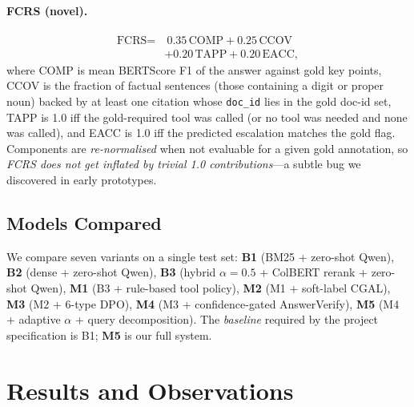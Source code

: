\documentclass[11pt,a4paper,twocolumn]{article}
\begin{document}
\paragraph{FCRS (novel).}\label{sec:fcrs}
\begin{equation}\label{eq:fcrs}
\begin{aligned}
\text{FCRS} =&~ 0.35\,\text{COMP} + 0.25\,\text{CCOV} \\
            &+ 0.20\,\text{TAPP} + 0.20\,\text{EACC},
\end{aligned}
\end{equation}
where COMP is mean BERTScore F1 of the answer against gold key points,
CCOV is the fraction of factual sentences (those containing a digit or
proper noun) backed by at least one citation whose \texttt{doc\_id} lies
in the gold doc-id set, TAPP is 1.0 iff the gold-required tool was
called (or no tool was needed and none was called), and EACC is 1.0 iff
the predicted escalation matches the gold flag. Components are
\emph{re-normalised} when not evaluable for a given gold annotation, so
\textit{FCRS does not get inflated by trivial 1.0 contributions}---a
subtle bug we discovered in early prototypes.

\subsection{Models Compared}

We compare seven variants on a single test set:
\textbf{B1} (BM25 + zero-shot Qwen),
\textbf{B2} (dense + zero-shot Qwen),
\textbf{B3} (hybrid $\alpha{=}0.5$ + ColBERT rerank + zero-shot Qwen),
\textbf{M1} (B3 + rule-based tool policy),
\textbf{M2} (M1 + soft-label CGAL),
\textbf{M3} (M2 + 6-type DPO),
\textbf{M4} (M3 + confidence-gated AnswerVerify),
\textbf{M5} (M4 + adaptive $\alpha$ + query decomposition).
The \emph{baseline} required by the project specification is B1;
\textbf{M5} is our full system.

\section{Results and Observations}\label{sec:results}
\end{document}
